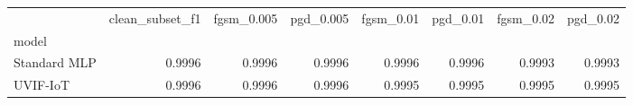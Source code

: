\begin{tabular}{lrrrrrrr}
\toprule
 & clean_subset_f1 & fgsm_0.005 & pgd_0.005 & fgsm_0.01 & pgd_0.01 & fgsm_0.02 & pgd_0.02 \\
model &  &  &  &  &  &  &  \\
\midrule
Standard MLP & 0.9996 & 0.9996 & 0.9996 & 0.9996 & 0.9996 & 0.9993 & 0.9993 \\
UVIF-IoT & 0.9996 & 0.9996 & 0.9996 & 0.9995 & 0.9995 & 0.9995 & 0.9995 \\
\bottomrule
\end{tabular}
